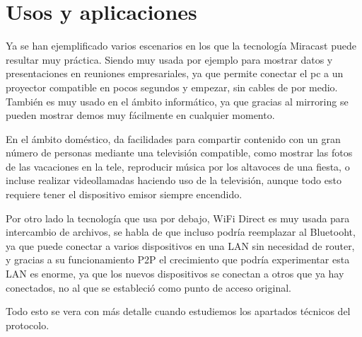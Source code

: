 \section{Usos y aplicaciones}

Ya se han ejemplificado varios escenarios en los que la tecnología Miracast puede resultar muy práctica. Siendo muy usada por ejemplo para mostrar datos y presentaciones en reuniones empresariales, ya que permite conectar el pc a un proyector compatible en pocos segundos y empezar, sin cables de por medio. También es muy usado en el ámbito informático, ya que gracias al mirroring se pueden mostrar demos muy fácilmente en cualquier momento.

En el ámbito doméstico, da facilidades para compartir contenido con un gran número de personas mediante una televisión compatible, como mostrar las fotos de las vacaciones en la tele, reproducir música por los altavoces de una fiesta, o incluse realizar videollamadas haciendo uso de la televisión, aunque todo esto requiere tener el dispositivo emisor siempre encendido.

Por otro lado la tecnología que usa por debajo, WiFi Direct es muy usada para intercambio de archivos, se habla de que incluso podría reemplazar al Bluetooht, ya que puede conectar a varios dispositivos en una LAN sin necesidad de router, y gracias a su funcionamiento P2P el crecimiento que podría experimentar esta LAN es enorme, ya que los nuevos dispositivos se conectan a otros que ya hay conectados, no al que se estableció como punto de acceso original.

Todo esto se vera con más detalle cuando estudiemos los apartados técnicos del protocolo.
